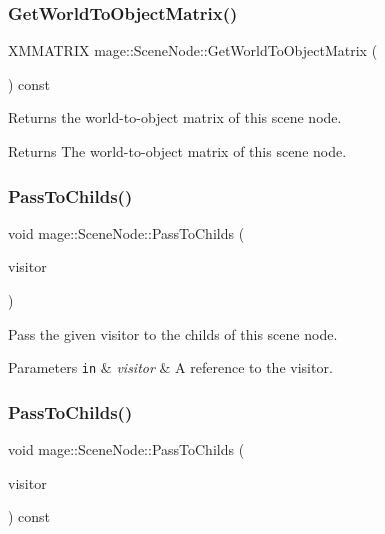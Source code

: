 \subsubsection{\texorpdfstring{Get\+World\+To\+Object\+Matrix()}{GetWorldToObjectMatrix()}}
{\footnotesize\ttfamily X\+M\+M\+A\+T\+R\+IX mage\+::\+Scene\+Node\+::\+Get\+World\+To\+Object\+Matrix (\begin{DoxyParamCaption}{ }\end{DoxyParamCaption}) const}

Returns the world-\/to-\/object matrix of this scene node.

\begin{DoxyReturn}{Returns}
The world-\/to-\/object matrix of this scene node. 
\end{DoxyReturn}
\hypertarget{classmage_1_1_scene_node_a4b46b3ab755050765ebc9fd15580068a}{}\label{classmage_1_1_scene_node_a4b46b3ab755050765ebc9fd15580068a} 
\subsubsection{\texorpdfstring{Pass\+To\+Childs()}{PassToChilds()}\hspace{0.1cm}{\footnotesize\ttfamily [1/2]}}
{\footnotesize\ttfamily void mage\+::\+Scene\+Node\+::\+Pass\+To\+Childs (\begin{DoxyParamCaption}\item[{\hyperlink{classmage_1_1_scene_node_visitor}{Scene\+Node\+Visitor} \&}]{visitor }\end{DoxyParamCaption})\hspace{0.3cm}{\ttfamily [protected]}}

Pass the given visitor to the childs of this scene node.


\begin{DoxyParams}[1]{Parameters}
\mbox{\tt in}  & {\em visitor} & A reference to the visitor. \\
\hline
\end{DoxyParams}
\hypertarget{classmage_1_1_scene_node_a72a785a090d9f316c8f5516deddf5b7e}{}\label{classmage_1_1_scene_node_a72a785a090d9f316c8f5516deddf5b7e} 
\subsubsection{\texorpdfstring{Pass\+To\+Childs()}{PassToChilds()}\hspace{0.1cm}{\footnotesize\ttfamily [2/2]}}
{\footnotesize\ttfamily void mage\+::\+Scene\+Node\+::\+Pass\+To\+Childs (\begin{DoxyParamCaption}\item[{\hyperlink{classmage_1_1_scene_node_visitor}{Scene\+Node\+Visitor} \&}]{visitor }\end{DoxyParamCaption}) const\hspace{0.3cm}{\ttfamily [protected]}}

